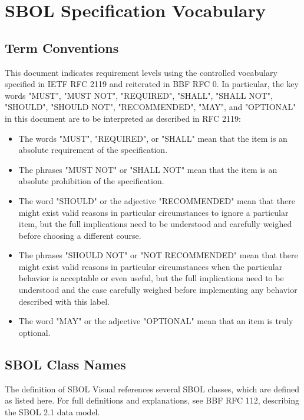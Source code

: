 \section{SBOL Specification Vocabulary}

\subsection{Term Conventions}

This document indicates requirement levels using the controlled vocabulary specified in IETF RFC 2119 and reiterated in BBF RFC 0.
In particular, the key words "MUST", "MUST NOT", "REQUIRED", "SHALL", "SHALL NOT", "SHOULD", "SHOULD NOT", "RECOMMENDED", "MAY", and "OPTIONAL" in this document are to be interpreted as described in RFC 2119:

\begin{itemize}
\item The words "MUST", "REQUIRED", or "SHALL" mean that the item is an absolute requirement of the specification.
\item The phrases "MUST NOT" or "SHALL NOT" mean that the item is an absolute prohibition of the specification.
\item The word "SHOULD" or the adjective "RECOMMENDED" mean that there might exist valid reasons in particular circumstances to ignore a particular item, but the full implications need to be understood and carefully weighed before choosing a different course.
\item The phrases "SHOULD NOT" or "NOT RECOMMENDED" mean that there might exist valid reasons in particular circumstances when the particular behavior is acceptable or even useful, but the full implications need to be understood and the case carefully weighed before implementing any behavior described with this label.
\item The word "MAY" or the adjective "OPTIONAL" mean that an item is truly optional.
\end{itemize}

\subsection{SBOL Class Names}

The definition of SBOL Visual references several SBOL classes, which are defined as listed here.  For full definitions and explanations, see BBF RFC 112, describing the SBOL 2.1 data model.

